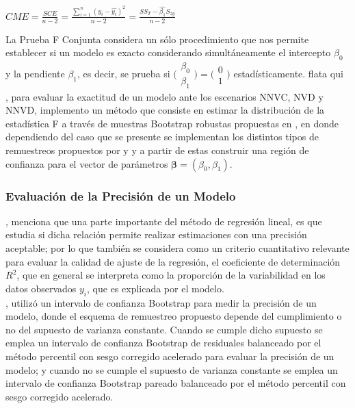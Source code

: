 \begin{center}
	$ CME =  \frac{SCE}{n-2} = \frac{ \sum_{i=1}^{n} (y_{i} - \hat{y_{i}} )^{2} }{n - 2 } =  \frac{SS_{T} - \hat{\beta_{1}} S_{zy}}{n -2} $ \\
\end{center}


La Prueba F Conjunta considera un sólo procedimiento que nos permite establecer si un modelo es exacto considerando simultáneamente el intercepto \(\beta_0\) y la pendiente \(\beta_1\), es decir, se prueba si $\bigl(\begin{smallmatrix} \beta_{0} \\ \beta_{1} \end{smallmatrix}\bigr) = \bigl(\begin{smallmatrix}0  \\  1\end{smallmatrix}\bigr) $ estadísticamente. flata qui \\

\textcite{zacarias-2023}, para evaluar la exactitud de un modelo ante los escenarios NNVC, NVD y NNVD, implemento un método que consiste en estimar la distribución de la estadística F a través de muestras Bootstrap robustas propuestas en \textcite{rana-2012}, en donde dependiendo del caso que se presente se implementan los distintos tipos de remuestreos propuestos por \textcite{wu-1986} y \textcite{liu-1988} y a partir de estas construir una región de confianza para el vector de parámetros $ \mathbf{\beta} = (\beta_{0}, \beta_{1})$.\\


\subsubsection{Evaluación de la Precisión de un Modelo}

\textcite{zacarias-2023}, menciona que una parte importante del método de regresión lineal, es que estudia si dicha relación permite realizar estimaciones con una precisión aceptable; por lo que también se considera como un criterio cuantitativo relevante para evaluar la calidad de ajuste de la regresión, el coeficiente de determinación $R^{2}$, que en general se interpreta como la proporción de la variabilidad en los datos observados $y_{i}$, que es explicada por el modelo.\\


\textcite{balam-2012}, utilizó un intervalo de confianza Bootstrap para medir la precisión de un modelo, donde el esquema de remuestreo propuesto depende del cumplimiento o no del supuesto de varianza constante. Cuando se cumple dicho supuesto se emplea un intervalo de confianza Bootstrap de residuales balanceado por el método percentil con sesgo corregido acelerado para evaluar la precisión de un modelo; y cuando no se cumple el supuesto de varianza constante se emplea un intervalo de confianza Bootstrap pareado balanceado por el método percentil con sesgo corregido acelerado.\\

